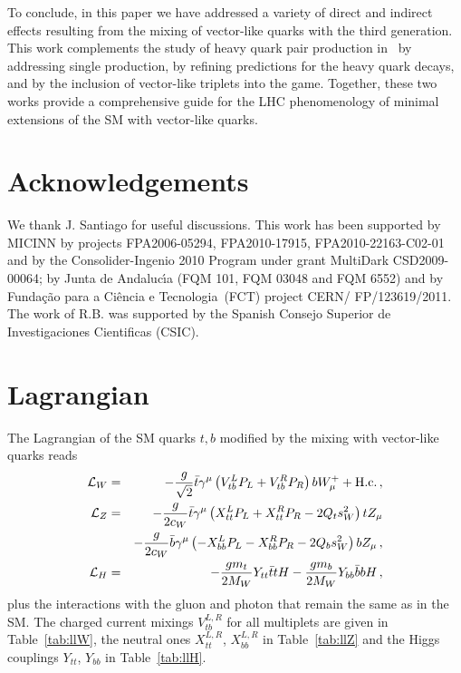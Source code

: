 \documentclass[12pt,a4paper]{article}
\newcommand{\gm}{\gamma^\mu}
\newcommand{\Wm}{W_{\mu}}
\newcommand{\Zm}{Z_{\mu}}
\begin{document}
To conclude, in this paper we have addressed a variety of direct and indirect effects resulting from the mixing of vector-like quarks with the third generation. This work complements the study of heavy quark pair production in~\cite{AguilarSaavedra:2009es} by addressing single production, by refining predictions for the heavy quark decays, and by the inclusion of vector-like triplets into the game. Together, these two works provide a comprehensive guide for the LHC phenomenology of minimal extensions of the SM with vector-like quarks.

\section*{Acknowledgements}
We thank J. Santiago for useful discussions.
This work has been supported by MICINN by projects FPA2006-05294, FPA2010-17915, FPA2010-22163-C02-01 and by the Consolider-Ingenio 2010 Program under grant MultiDark CSD2009-00064; by
Junta de Andaluc\'{\i}a (FQM 101, FQM 03048 and FQM 6552) and by Funda\c c\~ao
para a Ci\^encia e Tecnologia~(FCT) project CERN/ FP/123619/2011. The work of R.B. was supported by the Spanish Consejo Superior de Investigaciones Cientificas (CSIC).

\appendix

\section{Lagrangian}
\label{sec:a}

The Lagrangian of the SM quarks $t,b$ modified by the mixing with vector-like quarks reads
\begin{eqnarray}
\mathcal{L}_W & = & -\frac{g}{\sqrt 2} \bar t \gm \left( V_{tb}^L P_L + V_{tb}^R P_R \right) b \Wm^+ +\text{H.c.} \,, \notag \\ 
%
\mathcal{L}_Z & = & -\frac{g}{2 c_W} \bar t \gm \left( X_{tt}^L P_L + X_{tt}^R P_R - 2 Q_t s_W^2 \right) t \Zm \notag \\
& & -\frac{g}{2 c_W} \bar b \gm \left( -X_{bb}^L P_L - X_{bb}^R P_R - 2 Q_b s_W^2 \right) b \Zm \,, \notag \\
%
\mathcal{L}_H & = & -\frac{g m_t}{2M_W} Y_{tt} \bar t t H -\frac{g m_b}{2M_W} Y_{bb} \bar b b H \,,
\label{ec:ll}
\end{eqnarray}
plus the interactions with the gluon and photon that remain the same as in the SM. The charged current mixings $V_{tb}^{L,R}$ for all multiplets are given in Table~\ref{tab:llW}, the neutral ones $X_{tt}^{L,R}$, $X_{bb}^{L,R}$ in Table~\ref{tab:llZ} and the Higgs couplings $Y_{tt}$, $Y_{bb}$ in Table~\ref{tab:llH}.
\end{document}
